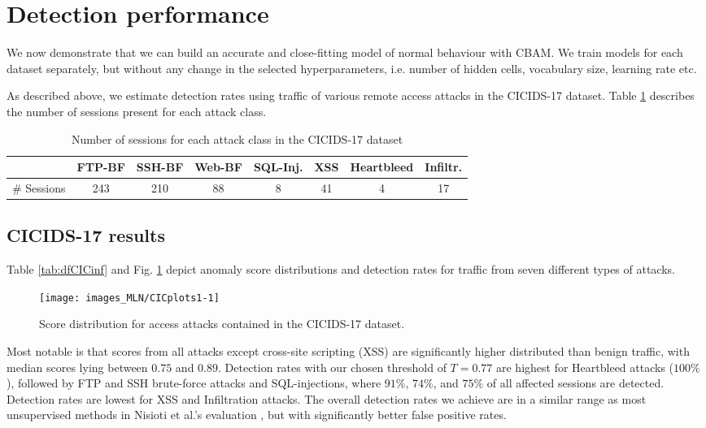 \section{Detection performance}\label{Sec:Det}

We now demonstrate that we can build an accurate and close-fitting model of normal behaviour with CBAM. We train models for each dataset separately, but without any change in the selected hyperparameters, i.e. number of hidden cells, vocabulary size, learning rate etc. 

As described above, we estimate detection rates using traffic of various remote access attacks in the CICIDS-17 dataset. Table \ref{tab:Attackdata} describes the number of sessions present for each attack class.

\begin{table}[ht]
\centering
\small
\begin{tabular}{l|ccccccc}
&FTP-BF&SSH-BF&Web-BF&SQL-Inj.&XSS&Heartbleed&Infiltr.\\
\hline
\# Sessions&243&210&88&8&41&4&17\\[0.2cm]
\end{tabular}
\vspace{2pt}
\caption{Number of sessions for each attack class in the CICIDS-17 dataset}\label{tab:Attackdata}
\end{table}

\subsection{CICIDS-17 results}\label{Sec:DetCIC}


Table \ref{tab:dfCICinf} and Fig. \ref{fig:CICplots1} 
depict anomaly score distributions and detection rates for traffic from seven different types of attacks.


\begin{figure}[ht]
\begin{center}
\texttt{[image: images\_MLN/CICplots1-1]} 
\vspace{-0.5cm}
\caption[Score distribution for various access attacks contained in the CICIDS-17 dataset, along with our detection threshold]{Score distribution for access attacks contained in the CICIDS-17 dataset.}\label{fig:CICplots1}
\end{center}
\end{figure}

Most notable is that scores from all attacks except cross-site scripting (XSS) are significantly higher distributed than benign traffic, with median scores lying between $0.75$ and $0.89$. Detection rates with our chosen threshold of $T=0.77$ are highest for Heartbleed attacks ($100\%$), followed by FTP and SSH brute-force attacks and SQL-injections, where $91\%$, $74\%$, and $75\%$ of all affected sessions are detected. Detection rates are lowest for XSS and Infiltration attacks. The overall detection rates we achieve are in a similar range as most unsupervised methods in Nisioti et al.'s evaluation \cite{nisioti2018intrusion}, but with significantly better false positive rates.



